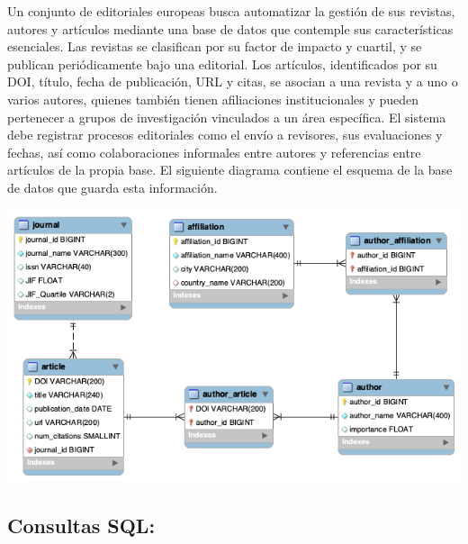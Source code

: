 \documentclass{db-practice}
\begin{document}
Un conjunto de editoriales europeas busca automatizar la gestión de sus revistas, autores y artículos mediante una base de datos que contemple sus características esenciales. Las revistas se clasifican por su factor de impacto y cuartil, y se publican periódicamente bajo una editorial. Los artículos, identificados por su DOI, título, fecha de publicación, URL y citas, se asocian a una revista y a uno o varios autores, quienes también tienen afiliaciones institucionales y pueden pertenecer a grupos de investigación vinculados a un área específica. El sistema debe registrar procesos editoriales como el envío a revisores, sus evaluaciones y fechas, así como colaboraciones informales entre autores y referencias entre artículos de la propia base. El siguiente diagrama contiene el esquema de la base de datos que guarda esta información.

\includegraphics[width=\textwidth]{figs/sql/articulos-cientificos-diagram.png}

\subsection*{Consultas SQL:}
\end{document}
